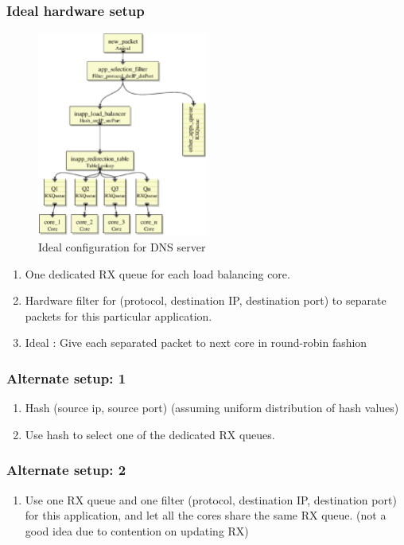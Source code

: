 \subsubsection{Ideal hardware setup}


\begin{figure}[t]
\centering
\includegraphics[width=0.5\textwidth]{figures/DNSServerIdeal.eps}
\caption{Ideal configuration for DNS server}
\end{figure}


\begin{enumerate}
    \item One dedicated RX queue for each load balancing core.
    \item Hardware filter for (protocol, destination IP, destination port) to separate
    packets for this particular application.
    \item Ideal : Give each separated packet to next core in round-robin fashion
\end{enumerate}

\subsubsection{Alternate setup: 1}
\begin{enumerate}
       \item Hash (source ip, source port) (assuming uniform distribution of hash values)
       \item Use hash to select one of the dedicated RX queues.
\end{enumerate}

\subsubsection{Alternate setup: 2}
\begin{enumerate}
       \item Use one RX queue and one filter (protocol, destination IP,
        destination port) for this application, and let all the cores
        share the same RX queue.
        (not a good idea due to contention on updating RX)
\end{enumerate}

